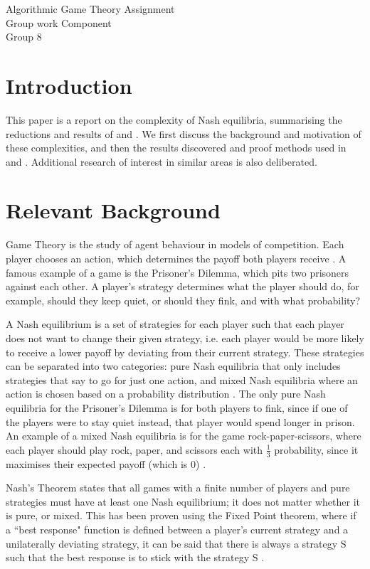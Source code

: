 \documentclass{article}
\begin{document}
\begin{center}
	\LARGE{Algorithmic Game Theory Assignment}\\[0.1cm]
	\Large{Group work Component}\\[0.1cm]
	Group 8\\[0.1cm]
\end{center}

\section{Introduction}
This paper is a report on the complexity of Nash equilibria, summarising the reductions and results of \cite{Daskalakis.2009} and \cite{Fabrikant.2004}. We first discuss the background and motivation of these complexities, and then the results discovered and proof methods used in \cite{Daskalakis.2009} and \cite{Fabrikant.2004}. Additional research of interest in similar areas is also deliberated.
\section{Relevant Background}
Game Theory is the study of agent behaviour in models of competition. Each player chooses an action, which determines the payoff both players receive \cite{OsborneMartinJ..2011}. A famous example of a game is the Prisoner’s Dilemma, which pits two prisoners against each other. A player’s strategy determines what the player should do, for example, should they keep quiet, or should they fink, and with what probability?

A Nash equilibrium is a set of strategies for each player such that each player does not want to change their given strategy, i.e. each player would be more likely to receive a lower payoff by deviating from their current strategy. These strategies can be separated into two categories: pure Nash equilibria that only includes strategies that say to go for just one action, and mixed Nash equilibria where an action is chosen based on a probability distribution \cite{OsborneMartinJ..2011}. The only pure Nash equilibria for the Prisoner’s Dilemma is for both players to fink, since if one of the players were to stay quiet instead, that player would spend longer in prison. An example of a mixed Nash equilibria is for the game rock-paper-scissors, where each player should play rock, paper, and scissors each with $\frac{1}{3}$ probability, since it maximises their expected payoff (which is 0) \cite{Daskalakis.2009}.

Nash’s Theorem states that all games with a finite number of players and pure strategies must have at least one Nash equilibrium; it does not matter whether it is pure, or mixed. This has been proven using the Fixed Point theorem, where if a ``best response" function is defined between a player’s current strategy and a unilaterally deviating strategy, it can be said that there is always a strategy S such that the best response is to stick with the strategy S \cite{NashJohnF..1950}.
\end{document}
